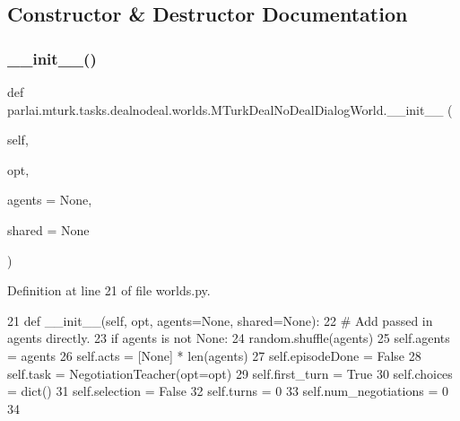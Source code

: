 \subsection{Constructor \& Destructor Documentation}
\mbox{\label{classparlai_1_1mturk_1_1tasks_1_1dealnodeal_1_1worlds_1_1MTurkDealNoDealDialogWorld_a8100fb989ef8abce5684218f72e30a9f}} 
\subsubsection{\texorpdfstring{\+\_\+\+\_\+init\+\_\+\+\_\+()}{\_\_init\_\_()}}
{\footnotesize\ttfamily def parlai.\+mturk.\+tasks.\+dealnodeal.\+worlds.\+M\+Turk\+Deal\+No\+Deal\+Dialog\+World.\+\_\+\+\_\+init\+\_\+\+\_\+ (\begin{DoxyParamCaption}\item[{}]{self,  }\item[{}]{opt,  }\item[{}]{agents = {\ttfamily None},  }\item[{}]{shared = {\ttfamily None} }\end{DoxyParamCaption})}



Definition at line 21 of file worlds.\+py.


\begin{DoxyCode}
21     \textcolor{keyword}{def }\_\_init\_\_(self, opt, agents=None, shared=None):
22         \textcolor{comment}{# Add passed in agents directly.}
23         \textcolor{keywordflow}{if} agents \textcolor{keywordflow}{is} \textcolor{keywordflow}{not} \textcolor{keywordtype}{None}:
24             random.shuffle(agents)
25         self.agents = agents
26         self.acts = [\textcolor{keywordtype}{None}] * len(agents)
27         self.episodeDone = \textcolor{keyword}{False}
28         self.task = NegotiationTeacher(opt=opt)
29         self.first\_turn = \textcolor{keyword}{True}
30         self.choices = dict()
31         self.selection = \textcolor{keyword}{False}
32         self.turns = 0
33         self.num\_negotiations = 0
34 
\end{DoxyCode}


